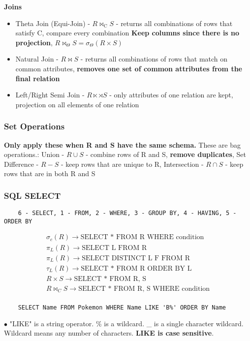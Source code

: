 \documentclass[9pt]{extarticle}
\begin{document}
\textbf{Joins}
\begin{itemize}
    \item Theta Join (Equi-Join) - $R \bowtie_{\text{C}} S$ - returns all 
    combinations of rows that satisfy C, compare every combination \textbf{Keep
    columns since there is no projection}, $R \bowtie_{\Theta} S = 
    \sigma_{\Theta}(R \times S)$
    \item Natural Join - $R \bowtie S$ - returns all combinations of rows that
    match on common attributes, \textbf{removes one set of common attributes
    from the final relation}
    \item Left/Right Semi Join - $R \ltimes \rtimes S$ - only attributes of one 
    relation
    are kept, projection on all elements of one relation
\end{itemize}

\subsubsection*{Set Operations}
\textbf{Only apply these when R and S have the same schema.} These are bag
operations.: Union - $R \cup S$ - combine rows of R and S, \textbf{remove duplicates},
Set Difference - $R - S$ - keep rows that are unique to R,
Intersection - $R \cap S$ - keep rows that are in both R and S

\subsubsection*{SQL SELECT}
\begin{verbatim}
    6 - SELECT, 1 - FROM, 2 - WHERE, 3 - GROUP BY, 4 - HAVING, 5 - ORDER BY
\end{verbatim}
\begin{gather*}
    \sigma_c(R) \rightarrow \text{SELECT * FROM R WHERE condition} \\
    \pi_L(R) \rightarrow \text{SELECT L FROM R} \\
    \pi_L(R) \rightarrow \text{SELECT DISTINCT L F FROM R} \\
    \tau_L(R) \rightarrow \text{SELECT * FROM R ORDER BY L} \\
    R \times S \rightarrow \text{SELECT * FROM R, S} \\
    R \bowtie_C S \rightarrow \text{SELECT * FROM R, S WHERE condition} \\
\end{gather*}

\begin{verbatim}
    SELECT Name FROM Pokemon WHERE Name LIKE 'B%' ORDER BY Name
\end{verbatim}
$\bullet$ "LIKE" is a string operator. \% is a wildcard. \_ is a single character 
wildcard. Wildcard means any number of characters. \textbf{LIKE is case 
sensitive}.
\end{document}
